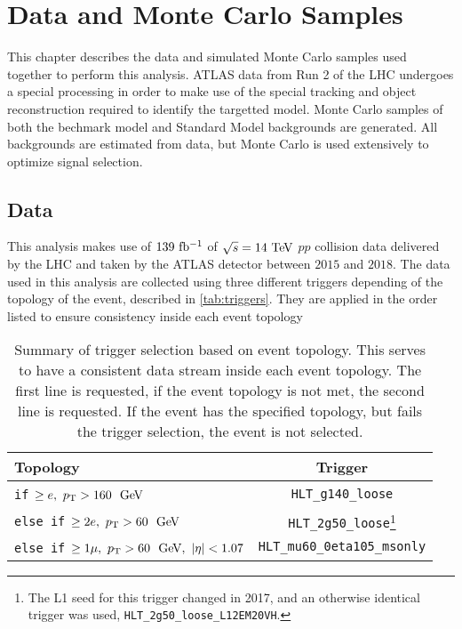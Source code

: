 \chapter{Data and Monte Carlo Samples}

This chapter describes the data and simulated Monte Carlo samples used together to perform this analysis. ATLAS data from Run 2 of the LHC undergoes a special processing in order to make use of the special tracking and object reconstruction required to identify the targetted model. Monte Carlo samples of both the bechmark model and Standard Model backgrounds are generated. All backgrounds are estimated from data, but Monte Carlo is used extensively to optimize signal selection.

\section{Data}

This analysis makes use of $139~\mbox{fb\(^{-1}\)}$ of $\sqrt{s}=14\TeV$ $pp$ collision data delivered by the \ac{LHC} and taken by the \ac{ATLAS} detector between $2015$ and $2018$. The data used in this analysis are collected using three different triggers depending of the topology of the event, described in \autoref{tab:triggers}. They are applied in the order listed to ensure consistency inside each event topology

\begin{table}[htb]
\small
\begin{center}
\begin{tabular}{|l|c|}
\hline
Topology       & Trigger \\
\hline\hline
\texttt{if} $\geq e,~\pt > 160~\gev$      & \texttt{HLT\_g140\_loose}    \\
\texttt{else if} $\geq 2e,~\pt > 60~\gev$  & \texttt{HLT\_2g50\_loose}\footnote{The L1 seed for this trigger changed in 2017, and an otherwise identical trigger was used, \texttt{HLT\_2g50\_loose\_L12EM20VH}.} \\
\texttt{else if} $\geq 1 \mu,~\pt > 60~\gev,~|\eta| < 1.07$                            & \texttt{HLT\_mu60\_0eta105\_msonly}   \\
\hline
\end{tabular}
\caption{Summary of trigger selection based on event topology. This serves to have a consistent data stream inside each event topology. The first line is requested, if the event topology is not met, the second line is requested. If the event has the specified topology, but fails the trigger selection, the event is not selected.}
\label{tab:triggers}
\end{center}
\end{table}

